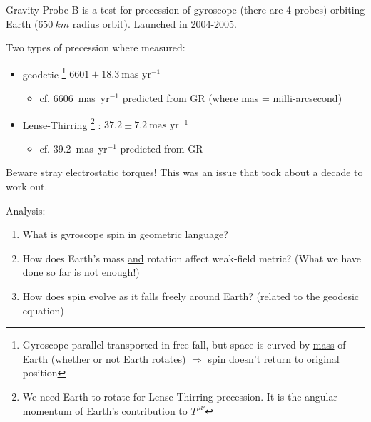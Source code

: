 \documentclass[a4paper]{article} %
\begin{document}
Gravity Probe B is a test for precession of gyroscope (there are 4 probes) orbiting Earth ($\SI{650}{km}$ radius orbit). Launched in 2004-2005.

Two types of precession where measured:
\begin{itemize}
\item geodetic
\footnote{Gyroscope parallel transported in free fall, but space is curved by \underline{mass} of Earth (whether or not Earth rotates) $\Rightarrow$ spin doesn't return to original position} 
$6601\pm 18.3~\text{mas~yr}^{-1}$
\begin{itemize}
\item cf. 6606~mas~yr$^{-1}$ predicted from GR (where mas = milli-arcsecond)
\end{itemize}
\item Lense-Thirring
\footnote{We need Earth to rotate for Lense-Thirring precession. It is the angular momentum of Earth's contribution to $T^{\mu\nu}$}
: $37.2 \pm 7.2~\text{mas~yr}^{-1}$
\begin{itemize}
\item cf. 39.2~mas~yr$^{-1}$ predicted from GR
\end{itemize}
\end{itemize}
Beware stray electrostatic torques! This was an issue that took about a decade to work out.

Analysis:
\begin{enumerate}
\item What is gyroscope spin in geometric language?
\item How does Earth's mass \underline{and} rotation affect weak-field metric? (What we have done so far is not enough!)
\item How does spin evolve as it falls freely around Earth? (related to the geodesic equation)
\end{enumerate}
\end{document}
